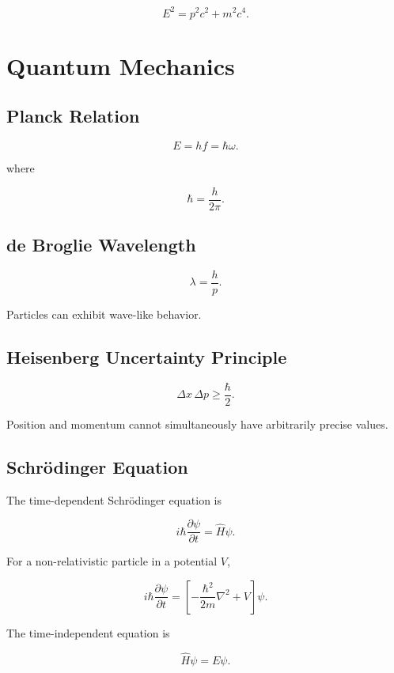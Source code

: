 \documentclass[11pt,a4paper]{article}
\begin{document}
\[
E^2=p^2c^2+m^2c^4.
\]

\section{Quantum Mechanics}

\subsection{Planck Relation}

\[
E=hf=\hbar\omega.
\]

where

\[
\hbar=\frac{h}{2\pi}.
\]

\subsection{de Broglie Wavelength}

\[
\lambda=\frac{h}{p}.
\]

Particles can exhibit wave-like behavior.

\subsection{Heisenberg Uncertainty Principle}

\[
\Delta x\,\Delta p
\geq
\frac{\hbar}{2}.
\]

Position and momentum cannot simultaneously have arbitrarily precise values.

\subsection{Schr\"odinger Equation}

The time-dependent Schr\"odinger equation is

\[
i\hbar
\frac{\partial\psi}{\partial t}
=
\hat{H}\psi.
\]

For a non-relativistic particle in a potential $V$,

\[
i\hbar
\frac{\partial\psi}{\partial t}
=
\left[
-\frac{\hbar^2}{2m}\nabla^2
+
V
\right]\psi.
\]

The time-independent equation is

\[
\hat{H}\psi=E\psi.
\]
\end{document}
